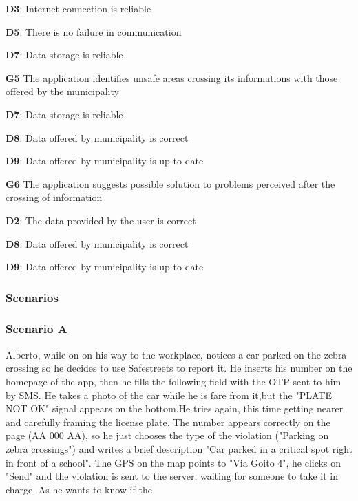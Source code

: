 \begin{outline}
\2 \textbf{D3}: Internet connection is reliable

\2 \textbf{D5}: There is no failure in communication

\2 \textbf{D7}: Data storage is reliable


\1  \textbf{G5} The application identifies unsafe areas crossing its informations with those offered by the municipality

\2 \textbf{D7}: Data storage is reliable

\2 \textbf{D8}: Data offered by municipality is correct

\2 \textbf{D9}: Data offered by municipality is up-to-date



\1  \textbf{G6} The application suggests possible solution to problems perceived after the crossing of information

\2 \textbf{D2}: The data provided by the user is correct

\2 \textbf{D8}: Data offered by municipality is correct

\2 \textbf{D9}: Data offered by municipality is up-to-date

\end{outline}


\subsubsection{Scenarios}

\subsubsection*{Scenario A}

Alberto, while on on his way to the workplace, notices a car parked on the zebra crossing so he decides to use Safestreets to report it. He inserts his number on the homepage of the app, then he fills the following field with the OTP sent to him by SMS. He takes a photo of the car while he is fare from it,but the "PLATE NOT OK" signal appears on the bottom.He tries again, this time getting nearer and carefully framing the license plate. The number appears correctly on the page (AA 000 AA), so he just chooses the type of the violation ("Parking on zebra crossings") and writes a brief description "Car parked in a critical spot right in front of a school". The GPS on the map points to "Via Goito 4", he clicks on "Send" and the violation is sent to the server, waiting for someone to take it in charge.
As he wants to know if the 

